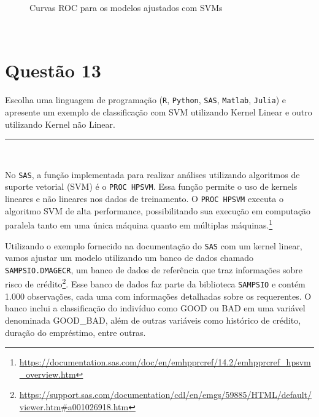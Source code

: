 \documentclass[
  a4paperpaper,
]{article}
\begin{document}
\begin{figure}[H]


\caption{\label{fig-q7d}Curvas ROC para os modelos ajustados com SVMs}

\end{figure}%

~ ~

\section{Questão 13}\label{questuxe3o-13}

Escolha uma linguagem de programação (\texttt{R}, \texttt{Python},
\texttt{SAS}, \texttt{Matlab}, \texttt{Julia}) e apresente um exemplo de
classificação com SVM utilizando Kernel Linear e outro utilizando Kernel
não Linear.

\begin{center}\rule{0.5\linewidth}{0.5pt}\end{center}

~

No \texttt{SAS}, a função implementada para realizar análises utilizando
algoritmos de suporte vetorial (SVM) é o \texttt{PROC\ HPSVM}. Essa
função permite o uso de kernels lineares e não lineares nos dados de
treinamento. O \texttt{PROC\ HPSVM} executa o algoritmo SVM de alta
performance, possibilitando sua execução em computação paralela tanto em
uma única máquina quanto em múltiplas máquinas.\footnote{\url{https://documentation.sas.com/doc/en/emhpprcref/14.2/emhpprcref_hpsvm_overview.htm}}

Utilizando o exemplo fornecido na documentação do \texttt{SAS} com um
kernel linear, vamos ajustar um modelo utilizando um banco de dados
chamado \texttt{SAMPSIO.DMAGECR}, um banco de dados de referência que
traz informações sobre risco de crédito\footnote{\url{https://support.sas.com/documentation/cdl/en/emgs/59885/HTML/default/viewer.htm\#a001026918.htm}}.
Esse banco de dados faz parte da biblioteca \texttt{SAMPSIO} e contém
1.000 observações, cada uma com informações detalhadas sobre os
requerentes. O banco inclui a classificação do indivíduo como GOOD ou
BAD em uma variável denominada GOOD\_BAD, além de outras variáveis como
histórico de crédito, duração do empréstimo, entre outras.
\end{document}
